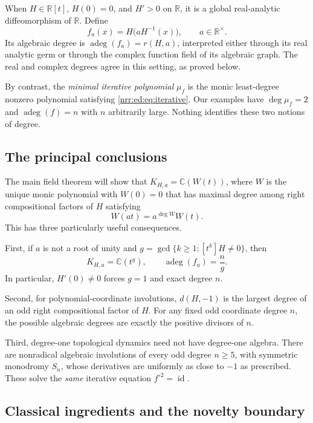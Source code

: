 \documentclass[11pt,letterpaper]{article}
\theoremstyle{definition}
\theoremstyle{remark}
\newcommand{\R}{\mathbb R}
\newcommand{\C}{\mathbb C}
\newcommand{\id}{\operatorname{id}}
\newcommand{\algdeg}{\operatorname{adeg}}
\newcommand{\field}{K_{H,a}}
\begin{document}
When $H\in\R[t]$, $H(0)=0$, and $H'>0$ on $\R$, it is a global real-analytic
diffeomorphism of $\R$. Define
\begin{equation}
 f_a(x)=H\bigl(aH^{-1}(x)\bigr),\qquad a\in\R^\times.
 \label{nrr:ed:eq:fa}
\end{equation}
Its algebraic degree is $\algdeg(f_a)=r(H,a)$, interpreted either through its
real analytic germ or through the complex function field of its algebraic graph.
The real and complex degrees agree in this setting, as proved below.

By contrast, the \emph{minimal iterative polynomial} $\mu_f$ is the monic
least-degree nonzero polynomial satisfying \eqref{nrr:ed:eq:iterative}. Our examples have
$\deg\mu_f=2$ and $\algdeg(f)=n$ with $n$ arbitrarily large. Nothing identifies
these two notions of degree.

\subsection{The principal conclusions}

The main field theorem will show that $\field=\C(W(t))$, where $W$ is the unique
monic polynomial with $W(0)=0$ that has maximal degree among right compositional
factors of $H$ satisfying
\begin{equation}
 W(at)=a^{\deg W}W(t).
 \label{nrr:ed:eq:eigen-intro}
\end{equation}
This has three particularly useful consequences.

First, if $a$ is not a root of unity and
$g=\gcd\{k\ge1:[t^k]H\ne0\}$, then
\begin{equation}
 \field=\C(t^g),\qquad \algdeg(f_a)=\frac{n}{g}.
 \label{nrr:ed:eq:main-preview}
\end{equation}
In particular, $H'(0)\ne0$ forces $g=1$ and exact degree $n$.

Second, for polynomial-coordinate involutions, $d(H,-1)$ is the largest degree of
an odd right compositional factor of $H$. For any fixed odd coordinate degree $n$,
the possible algebraic degrees are exactly the positive divisors of $n$.

Third, degree-one topological dynamics need not have degree-one algebra. There are
nonradical algebraic involutions of every odd degree $n\ge5$, with symmetric
monodromy $S_n$, whose derivatives are uniformly as close to $-1$ as prescribed.
These solve the \emph{same} iterative equation $f^{\circ2}=\id$.

\subsection{Classical ingredients and the novelty boundary}
\end{document}
